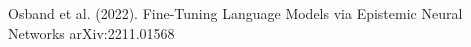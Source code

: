 \documentclass[preview]{standalone}
\begin{document}
Osband et al. (2022). Fine-Tuning Language Models via Epistemic Neural Networks arXiv:2211.01568\\
\end{document}
